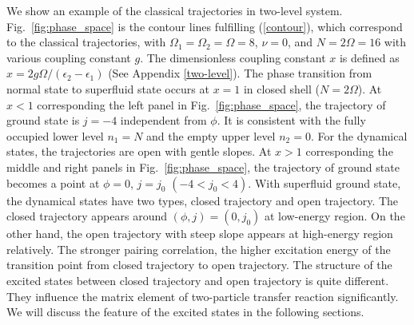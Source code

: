 \documentclass[11pt]{book} %
\begin{document}
We show an example of the classical trajectories in two-level system. Fig.~\ref{fig:phase_space} is the contour lines fulfilling (\ref{contour}), which correspond to the classical trajectories, with $\Omega_1=\Omega_2=\Omega=8$, $\nu=0$, and $N=2\Omega=16$ with various coupling constant $g$. The dimensionless coupling constant $x$ is defined as $x=2g\Omega/(\epsilon_2-\epsilon_1)$ (See Appendix \ref{two-level}). The phase transition from normal state to superfluid state occurs at $x=1$ in closed shell ($N=2\Omega$). At $x<1$ corresponding the left panel in Fig.~\ref{fig:phase_space}, the trajectory of ground state is $j=-4$ independent from $\phi$. It is consistent with the fully occupied lower level $n_1=N$ and the empty upper level $n_2=0$. For the dynamical states, the trajectories are open with gentle slopes. At $x>1$ corresponding the middle and right panels in Fig.~\ref{fig:phase_space}, the trajectory of ground state becomes a point at $\phi=0$, $j=j_0$ $(-4<j_0<4)$. With superfluid ground state, the dynamical states have two types, closed trajectory and open trajectory. The closed trajectory appears around $(\phi,j)=(0,j_0)$ at low-energy region. On the other hand, the open trajectory with steep slope appears at high-energy region relatively. The stronger pairing correlation, the higher excitation energy of the transition point from closed trajectory to open trajectory. The structure of the excited states between closed trajectory and open trajectory is quite different. They influence the matrix element of two-particle transfer reaction significantly. We will discuss the feature of the excited states in the following sections.
\end{document}
